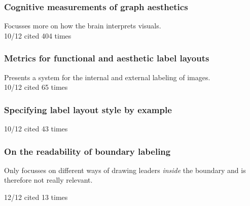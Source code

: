 \documentclass[a4paper]{article}
\begin{document}
\subsubsection{Cognitive measurements of graph aesthetics \cite{ware2002cognitive}}
Focusses more on how the brain interprets visuals. \\
10/12 cited 404 times

\subsubsection{Metrics for functional and aesthetic label layouts \cite{hartmann2005metrics}}
Presents a system for the internal and external labeling of images. \\
10/12 cited 65 times


\subsubsection{Specifying label layout style by example \cite{vollick2007specifying}}
10/12 cited 43 times

\subsubsection{On the readability of boundary labeling \cite{barth2015readability}}
Only focusses on different ways of drawing leaders \textit{inside} the boundary and is therefore not really relevant.

12/12 cited 13 times

{}

\end{document}

